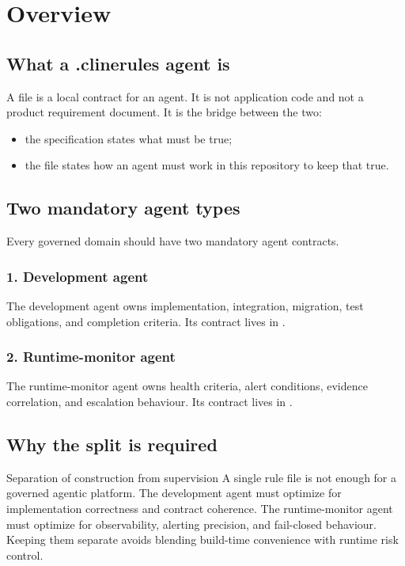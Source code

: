 \chapter{Overview}
\label{ch:overview}

\section{What a .clinerules agent is}

A  file is a local contract for an agent. It is
not application code and not a product requirement document. It is the
bridge between the two:
\begin{itemize}
  \item the specification states what must be true;
  \item the  file states how an agent must work
    in this repository to keep that true.
\end{itemize}

\section{Two mandatory agent types}

Every governed domain should have two mandatory agent contracts.

\subsection*{1. Development agent}

The development agent owns implementation, integration, migration, test
obligations, and completion criteria. Its contract lives in
.

\subsection*{2. Runtime-monitor agent}

The runtime-monitor agent owns health criteria, alert conditions,
evidence correlation, and escalation behaviour. Its contract lives in
.

\section{Why the split is required}

\begin{adrbox}{Separation of construction from supervision}
A single rule file is not enough for a governed agentic platform. The
development agent must optimize for implementation correctness and
contract coherence. The runtime-monitor agent must optimize for
observability, alerting precision, and fail-closed behaviour. Keeping
them separate avoids blending build-time convenience with runtime risk
control.
\end{adrbox}


